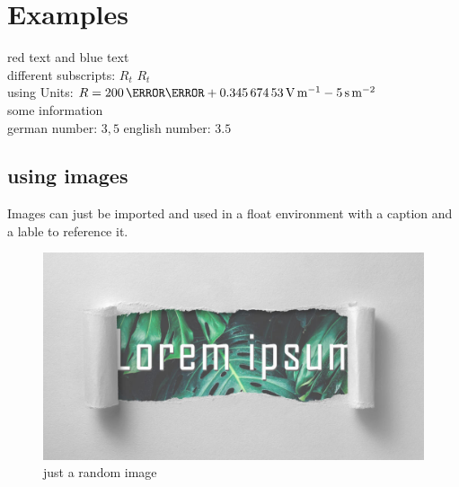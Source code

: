 \documentclass[	%
		11pt,a4paper,	%
		twoside,		%
		english,		%
		f1				%
	]{HsH-report}		%
\begin{document}
\maketitle				%
\declarationAuthorship

\begin{abstract}
	\lipsum[5-8]
\end{abstract}

\tableofcontents

\cleardoublepage %

\chapter{Examples}
	\label{chap: one}
	{\color{red}red text} and {\color{blue}blue text} \\
	different subscripts: \normalsubscripts$R_t$ \upsubscripts$R_t$ \\
	using Units: $R=200\,\milli\ohm + \SI{0.34567453}{\volt\per\metre} - 5\,\si{\second\per\metre\squared}$ \\
	some information\cite{laboranleitung:physik}\\
	german number: $3,5$ english number: $3.5$\\ %

	\section{using images}
	Images can just be imported and used in a float environment with a caption and a lable to reference it.
	\begin{figure}
		\includegraphics[width=.6\textwidth]{img/lorem-ipsum.jpg}
		\caption{just a random image}
	\end{figure}
\end{document}
